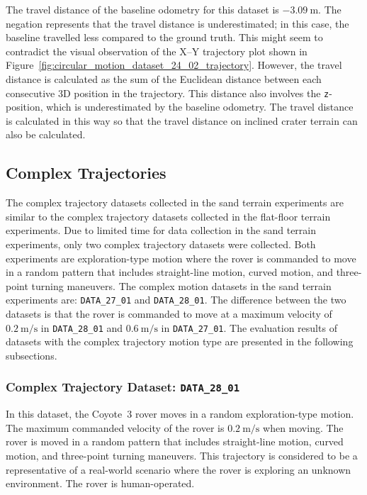 \documentclass[report.tex]{subfiles}
\begin{document}
    The travel distance of the baseline odometry for this dataset is $-3.09~\mathrm{m}$. The negation represents that the travel distance is underestimated; in this case, the baseline travelled less compared to the ground truth. This might seem to contradict the visual observation of the X--Y trajectory plot shown in Figure~\ref{fig:circular_motion_dataset_24_02_trajectory}. However, the travel distance is calculated as the sum of the Euclidean distance between each consecutive 3D position in the trajectory. This distance also involves the \texttt{z}-position, which is underestimated by the baseline odometry. The travel distance is calculated in this way so that the travel distance on inclined crater terrain can also be calculated. 
    \FloatBarrier
   
    \subsection{Complex Trajectories}    
    
    The complex trajectory datasets collected in the sand terrain experiments are similar to the complex trajectory datasets collected in the flat-floor terrain experiments. Due to limited time for data collection in the sand terrain experiments, only two complex trajectory datasets were collected. Both experiments are exploration-type motion where the rover is commanded to move in a random pattern that includes straight-line motion, curved motion, and three-point turning maneuvers. The complex motion datasets in the sand terrain experiments are: \texttt{DATA\_27\_01} and \texttt{DATA\_28\_01}. The difference between the two datasets is that the rover is commanded to move at a maximum velocity of $0.2~\mathrm{m/s}$ in \texttt{DATA\_28\_01} and $0.6~\mathrm{m/s}$ in \texttt{DATA\_27\_01}. The evaluation results of datasets with the complex trajectory motion type are presented in the following subsections.

    \subsubsection{Complex Trajectory Dataset: \texttt{DATA\_28\_01}} \label{subsubsec:complexTrajectoryD2_28_01}
    
    In this dataset, the Coyote~3 rover moves in a random exploration-type motion. The maximum commanded velocity of the rover is $0.2~\mathrm{m/s}$ when moving. The rover is moved in a random pattern that includes straight-line motion, curved motion, and three-point turning maneuvers. This trajectory is considered to be a representative of a real-world scenario where the rover is exploring an unknown environment. The rover is human-operated. 
    
\end{document}
